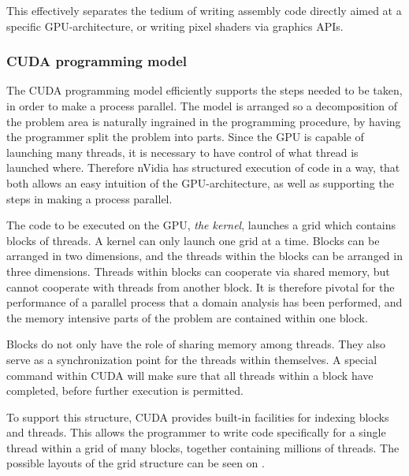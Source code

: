 This effectively separates the tedium of writing assembly code directly aimed at a specific GPU-architecture, or writing pixel shaders via graphics APIs.

\subsubsection{CUDA programming model}
The CUDA programming model efficiently supports the steps needed to be taken, in order to make a process parallel. The model is arranged so a decomposition of the problem area is naturally ingrained in the programming procedure, by having the programmer split the problem into parts. Since the GPU is capable of launching many threads, it is necessary to have control of what thread is launched where. Therefore nVidia has structured execution of code in a way, that both allows an easy intuition of the GPU-architecture, as well as supporting the steps in making a process parallel.

The code to be executed on the GPU, \emph{the kernel}, launches a grid which contains blocks of threads. A kernel can only launch one grid at a time. Blocks can be arranged in two dimensions, and the threads within the blocks can be arranged in three dimensions. Threads within blocks can cooperate via shared memory, but cannot cooperate with threads from another block. It is therefore pivotal for the performance of a parallel process that a domain analysis has been performed, and the memory intensive parts of the problem are contained within one block.

Blocks do not only have the role of sharing memory among threads. They also serve as a synchronization point for the threads within themselves. A special command within CUDA will make sure that all threads within a block have completed, before further execution is permitted.

To support this structure, CUDA provides built-in facilities for indexing blocks and threads. This allows the programmer to write code specifically for a single thread within a grid of many blocks, together containing millions of threads. The possible layouts of the grid structure can be seen on .

\newpage
{}



